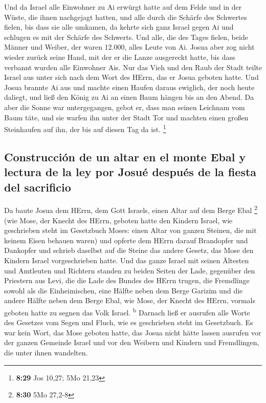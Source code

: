  Und da Israel alle Einwohner zu Ai erwürgt hatte auf dem
Felde und in der Wüste, die ihnen nachgejagt hatten, und alle durch die
Schärfe des Schwertes fielen, bis dass sie alle umkamen, da kehrte sich
ganz Israel gegen Ai und schlugen es mit der Schärfe des Schwerts.
 Und alle, die des Tages fielen, beide Männer und Weiber,
der waren 12.000, alles Leute von Ai.  Josua aber zog
nicht wieder zurück seine Hand, mit der er die Lanze ausgereckt hatte,
bis dass verbannt wurden alle Einwohner Ais.  Nur das
Vieh und den Raub der Stadt teilte Israel aus unter sich nach dem Wort
des HErrn, das er Josua geboten hatte.  Und Josua brannte
Ai aus und machte einen Haufen daraus ewiglich, der noch heute daliegt,
 und ließ den König zu Ai an einen Baum hängen bis an den
Abend. Da aber die Sonne war untergegangen, gebot er, dass man seinen
Leichnam vom Baum täte, und sie warfen ihn unter der Stadt Tor und
machten einen großen Steinhaufen auf ihn, der bis auf diesen Tag da ist.
\footnote{\textbf{8:29} Jos 10,27; 5Mo 21,23}

\hypertarget{construcciuxf3n-de-un-altar-en-el-monte-ebal-y-lectura-de-la-ley-por-josuuxe9-despuuxe9s-de-la-fiesta-del-sacrificio}{%
\subsection{Construcción de un altar en el monte Ebal y lectura de la
ley por Josué después de la fiesta del
sacrificio}\label{construcciuxf3n-de-un-altar-en-el-monte-ebal-y-lectura-de-la-ley-por-josuuxe9-despuuxe9s-de-la-fiesta-del-sacrificio}}

 Da baute Josua dem HErrn, dem Gott Israels, einen Altar
auf dem Berge Ebal \footnote{\textbf{8:30} 5Mo 27,2-8} 
(wie Mose, der Knecht des HErrn, geboten hatte den Kindern Israel, wie
geschrieben steht im Gesetzbuch Moses: einen Altar von ganzen Steinen,
die mit keinem Eisen behauen waren) und opferte dem HErrn darauf
Brandopfer und Dankopfer  und schrieb daselbst auf die
Steine das andere Gesetz, das Mose den Kindern Israel vorgeschrieben
hatte.  Und das ganze Israel mit seinen Ältesten und
Amtleuten und Richtern standen zu beiden Seiten der Lade, gegenüber den
Priestern aus Levi, die die Lade des Bundes des HErrn trugen, die
Fremdlinge sowohl als die Einheimischen, eine Hälfte neben dem Berge
Garizim und die andere Hälfte neben dem Berge Ebal, wie Mose, der Knecht
des HErrn, vormals geboten hatte zu segnen das Volk Israel.
\textsuperscript{b}  Darnach ließ er ausrufen alle Worte
des Gesetzes vom Segen und Fluch, wie es geschrieben steht im
Gesetzbuch.  Es war kein Wort, das Mose geboten hatte,
das Josua nicht hätte lassen ausrufen vor der ganzen Gemeinde Israel und
vor den Weibern und Kindern und Fremdlingen, die unter ihnen wandelten.

